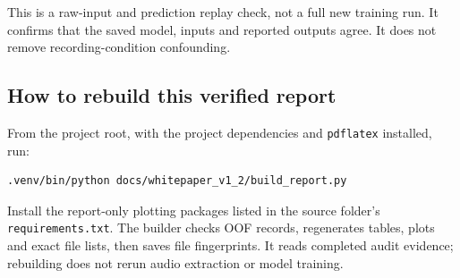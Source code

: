 \documentclass[11pt,a4paper]{article}
\begin{document}
This is a raw-input and prediction replay check, not a full new training run.
It confirms that the saved model, inputs and reported outputs agree. It does
not remove recording-condition confounding.

\subsection*{How to rebuild this verified report}
From the project root, with the project dependencies and \texttt{pdflatex}
installed, run:
{\small
\begin{verbatim}
.venv/bin/python docs/whitepaper_v1_2/build_report.py
\end{verbatim}
}
Install the report-only plotting packages listed in the source folder's
\texttt{requirements.txt}. The builder checks OOF records, regenerates tables,
plots and exact file lists, then saves file fingerprints. It reads completed
audit evidence; rebuilding does not rerun audio extraction or model training.

\clearpage
\end{document}
